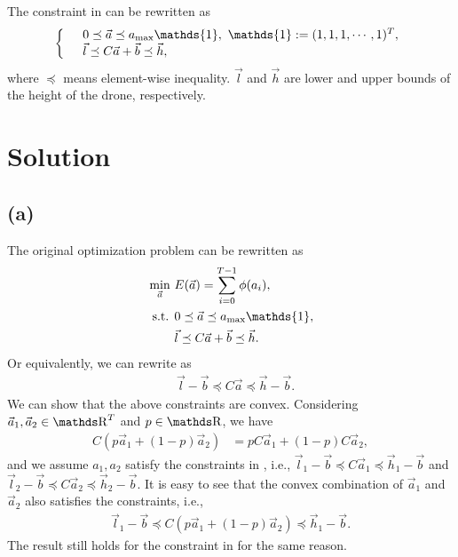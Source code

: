 \documentclass[letterpaper,10pt]{article}
\begin{document}
The constraint in  can be rewritten as
\begin{align}
    \label{eq:linear-map-constraint}
    \left\{
    \begin{array}{ll}
        & 0\preceq \vec a \preceq a_{\rm max}\mathds{1},~\mathds{1}:=(1,1,1,\cdots,1)^T,\\
        & \vec l\preceq C \vec a + \vec b \preceq \vec h,
    \end{array}\right.
\end{align}
where $\preceq$ means element-wise inequality. $\vec l$ and $\vec h$ are lower and upper bounds of the height of the drone, respectively.

\section{Solution}

\subsection*{(a)}

The original optimization problem can be rewritten as
\begin{align}
    \min_{\vec a}~ &E(\vec a) = \sum_{i=0}^{T-1} \phi(a_i),\\
    \label{eq:acc-constraint}
    \text{ s.t. } &0\preceq \vec a \preceq a_{\rm max}\mathds{1},\\
    \label{eq:height-constraint}
    &\vec l\preceq C \vec a + \vec b \preceq \vec h.
\end{align}
Or equivalently, we can rewrite  as
\begin{align}
    \label{eq:height-constraint2}
    &\vec l - \vec b \preceq C \vec a \preceq \vec h - \vec b.
\end{align}
We can show that the above constraints are convex.
Considering $\vec a_1, \vec a_2\in \Reals^T$ and $p\in \Reals$, we have
\begin{align}
    C (p \vec a_1 + (1-p) \vec a_2) &= p C \vec a_1 + (1-p) C \vec a_2,
\end{align}
and we assume $a_1,a_2$ satisfy the constraints in , i.e., $\vec l_1 - \vec b \preceq C \vec a_1 \preceq \vec h_1 - \vec b$ and $\vec l_2 - \vec b \preceq C \vec a_2 \preceq \vec h_2 - \vec b$.
It is easy to see that the convex combination of $\vec a_1$ and $\vec a_2$ also satisfies the constraints, i.e.,
\begin{align}
    \vec l_1 - \vec b \preceq C (p \vec a_1 + (1-p) \vec a_2) \preceq \vec h_1 - \vec b.
\end{align}
The result still holds for the constraint in  for the same reason.
\end{document}
